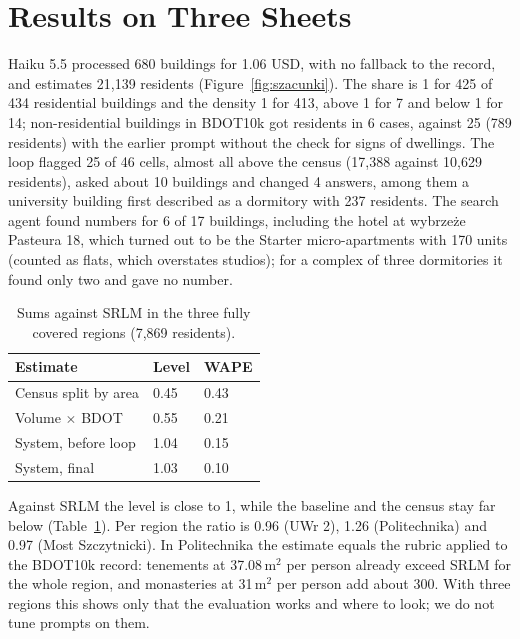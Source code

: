 \documentclass[11pt]{article}
\begin{document}
\section{Results on Three Sheets}

Haiku 5.5 processed 680 buildings for 1.06 USD, with no fallback to the record, and estimates 21,139 residents (Figure~\ref{fig:szacunki}).
The share is 1 for 425 of 434 residential buildings and the density 1 for 413, above 1 for 7 and below 1 for 14; non-residential buildings in BDOT10k got residents in 6 cases, against 25 (789 residents) with the earlier prompt without the check for signs of dwellings.
The loop flagged 25 of 46 cells, almost all above the census (17,388 against 10,629 residents), asked about 10 buildings and changed 4 answers, among them a university building first described as a dormitory with 237 residents.
The search agent found numbers for 6 of 17 buildings, including the hotel at wybrzeże Pasteura 18, which turned out to be the Starter micro-apartments with 170 units (counted as flats, which overstates studios); for a complex of three dormitories it found only two and gave no number.

\begin{table}[t]
  \centering
  \footnotesize
  \begin{tabular}{@{}lll@{}}
    \toprule
    Estimate & Level & WAPE \\
    \midrule
    Census split by area & 0.45 & 0.43 \\
    Volume $\times$ BDOT & 0.55 & 0.21 \\
    System, before loop & 1.04 & 0.15 \\
    System, final & 1.03 & 0.10 \\
    \bottomrule
  \end{tabular}
  \caption{Sums against SRLM in the three fully covered regions (7,869 residents).}
  \label{tab:wyniki}
\end{table}

Against SRLM the level is close to 1, while the baseline and the census stay far below (Table~\ref{tab:wyniki}).
Per region the ratio is 0.96 (UWr 2), 1.26 (Politechnika) and 0.97 (Most Szczytnicki).
In Politechnika the estimate equals the rubric applied to the BDOT10k record: tenements at 37.08\,m$^2$ per person already exceed SRLM for the whole region, and monasteries at 31\,m$^2$ per person add about 300.
With three regions this shows only that the evaluation works and where to look; we do not tune prompts on them.
\end{document}
